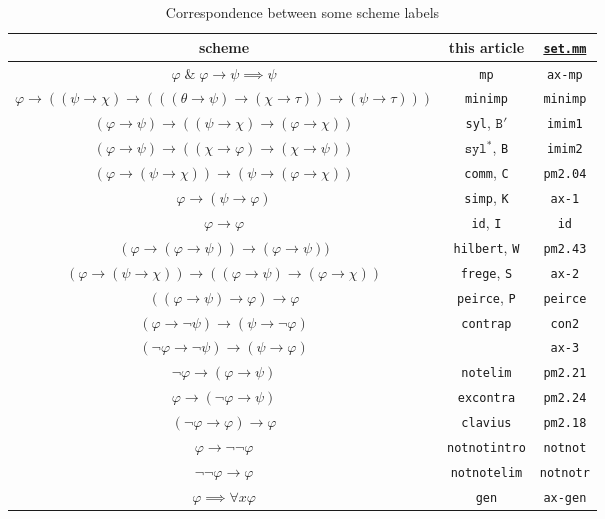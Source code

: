 \documentclass[11pt]{article}
\newcommand*{\andd}{\;\&\;}
\newcommand*{\rimplies}{\implies}
\renewcommand*{\phi}{\varphi}
\theoremstyle{plain}
\theoremstyle{definition}
\theoremstyle{remark}
\begin{document}
\begin{table}[!ht]
\begin{center}
\caption{Correspondence between some scheme labels}
\label{tab:labels}
\begin{tabular}{|c|c|c|}
\hline
scheme & this article & \href{https://us.metamath.org/mpeuni/mmset.html}{\texttt{set.mm}}\\
\hline
$\phi \andd \phi \to \psi \rimplies \psi$ & \texttt{mp} & \texttt{ax-mp}\\
$\phi \to ((\psi\to\chi) \to (((\theta\to\psi) \to (\chi\to\tau)) \to (\psi\to\tau)))$ & \texttt{minimp} &
\texttt{minimp}\\
$(\phi\to\psi) \to ((\psi\to\chi) \to (\phi\to\chi))$ & \texttt{syl}, $\texttt{B}'$ & \texttt{imim1}\\
$(\phi\to\psi) \to ((\chi\to\phi) \to (\chi\to\psi))$ & $\texttt{syl}^*$, \texttt{B} & \texttt{imim2}\\
$(\phi \to (\psi \to \chi)) \to (\psi \to (\phi \to \chi))$ & \texttt{comm}, \texttt{C} & \texttt{pm2.04}\\
$\phi \to (\psi \to \phi)$ & \texttt{simp}, \texttt{K} & \texttt{ax-1}\\
$\phi \to \phi$ & \texttt{id}, \texttt{I} & \texttt{id}\\
$(\phi \to (\phi \to \psi)) \to (\phi \to \psi))$ & \texttt{hilbert}, \texttt{W} & \texttt{pm2.43}\\
$(\phi \to (\psi \to \chi)) \to ((\phi \to \psi) \to (\phi \to \chi))$ & \texttt{frege}, \texttt{S} &
\texttt{ax-2}\\
$((\phi \to \psi) \to \phi) \to \phi$ & \texttt{peirce}, \texttt{P} & \texttt{peirce}\\
\hline
$(\phi \to \neg \psi) \to (\psi \to \neg \phi)$ & \texttt{contrap} & \texttt{con2}\\
$(\neg\phi \to \neg\psi) \to (\psi \to \phi)$ & & \texttt{ax-3}\\
$\neg\phi \to (\phi \to \psi)$ & \texttt{notelim} & \texttt{pm2.21}\\
$\phi \to (\neg\phi \to \psi)$ & \texttt{excontra} & \texttt{pm2.24}\\
$(\neg\phi \to \phi) \to \phi$ & \texttt{clavius} & \texttt{pm2.18}\\
$\phi \to \neg\neg\phi$ & \texttt{notnotintro} & \texttt{notnot}\\
$\neg\neg \phi \to \phi$ & \texttt{notnotelim} & \texttt{notnotr}\\
\hline
$\phi \rimplies \forall x \phi$ & \texttt{gen} & \texttt{ax-gen}\\

\end{tabular}
\end{center}
\end{table}
\end{document}
